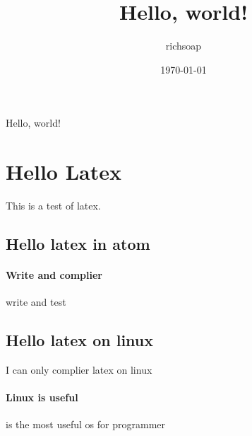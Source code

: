 \documentclass{article}
\title{Hello, world!}
\author{richsoap}
\date{\today}
\begin{document}
\maketitle
Hello, world!
\section{Hello Latex}
This is a test of latex.
\subsection{Hello latex in atom}
\paragraph{Write and complier}
write and test
\subsection{Hello latex on linux}
I can only complier latex on linux
\paragraph{Linux is useful}
is the most useful os for programmer
\end{document}
